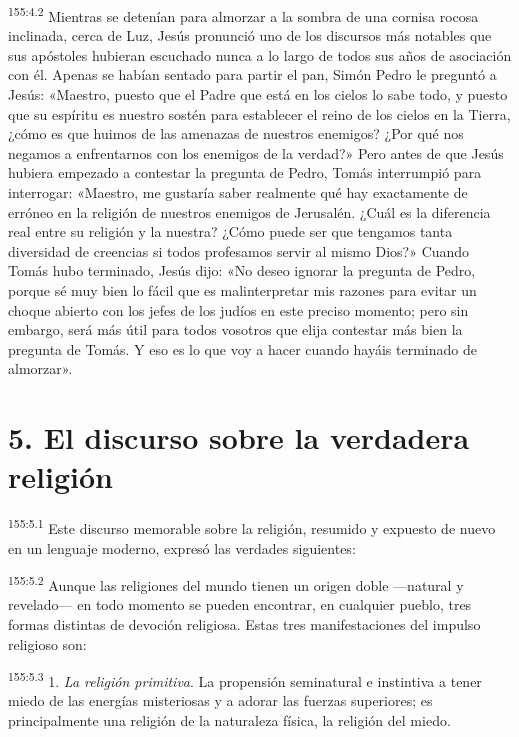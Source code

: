 \par 
\textsuperscript{155:4.2} Mientras se detenían para almorzar a la sombra de una cornisa rocosa inclinada, cerca de Luz, Jesús pronunció uno de los discursos más notables que sus apóstoles hubieran escuchado nunca a lo largo de todos sus años de asociación con él. Apenas se habían sentado para partir el pan, Simón Pedro le preguntó a Jesús: «Maestro, puesto que el Padre que está en los cielos lo sabe todo, y puesto que su espíritu es nuestro sostén para establecer el reino de los cielos en la Tierra, ¿cómo es que huimos de las amenazas de nuestros enemigos? ¿Por qué nos negamos a enfrentarnos con los enemigos de la verdad?» Pero antes de que Jesús hubiera empezado a contestar la pregunta de Pedro, Tomás interrumpió para interrogar: «Maestro, me gustaría saber realmente qué hay exactamente de erróneo en la religión de nuestros enemigos de Jerusalén. ¿Cuál es la diferencia real entre su religión y la nuestra? ¿Cómo puede ser que tengamos tanta diversidad de creencias si todos profesamos servir al mismo Dios?» Cuando Tomás hubo terminado, Jesús dijo: «No deseo ignorar la pregunta de Pedro, porque sé muy bien lo fácil que es malinterpretar mis razones para evitar un choque abierto con los jefes de los judíos en este preciso momento; pero sin embargo, será más útil para todos vosotros que elija contestar más bien la pregunta de Tomás. Y eso es lo que voy a hacer cuando hayáis terminado de almorzar».

\section*{5. El discurso sobre la verdadera religión}
\par 
\textsuperscript{155:5.1} Este discurso memorable sobre la religión, resumido y expuesto de nuevo en un lenguaje moderno, expresó las verdades siguientes:

\par 
\textsuperscript{155:5.2} Aunque las religiones del mundo tienen un origen doble ---natural y revelado--- en todo momento se pueden encontrar, en cualquier pueblo, tres formas distintas de devoción religiosa. Estas tres manifestaciones del impulso religioso son:

\par 
\textsuperscript{155:5.3} 1. \textit{La religión primitiva}. La propensión seminatural e instintiva a tener miedo de las energías misteriosas y a adorar las fuerzas superiores; es principalmente una religión de la naturaleza física, la religión del miedo.

